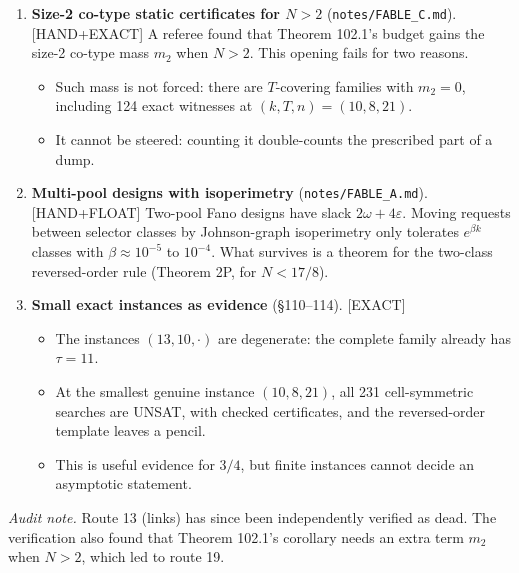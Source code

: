 \documentclass[11pt]{article}
\newcommand{\lvl}[1]{\textsf{\small[#1]}}
\begin{document}
\begin{enumerate}[leftmargin=*,label=\textbf{\arabic*.}]
 \begin{itemize}
 \item Take six members whose uncovered-pair endpoints fit in a $T$-set. One request then finishes, and this does
 imply CP.
 \item But it is CP with one inessential dump. Net of baseline dumping its budget is $5\varepsilon-\delta<0$ in the
 window.
 \end{itemize}
\item \textbf{Size-2 co-type static certificates for $N>2$} (\texttt{notes/FABLE\_C.md}). \lvl{HAND+EXACT} A referee
found that Theorem 102.1's budget gains the size-2 co-type mass $m_2$ when $N>2$. This opening fails for two reasons.
 \begin{itemize}
 \item Such mass is not forced: there are $T$-covering families with $m_2=0$, including 124 exact witnesses at
 $(k,T,n)=(10,8,21)$.
 \item It cannot be steered: counting it double-counts the prescribed part of a dump.
 \end{itemize}
\item \textbf{Multi-pool designs with isoperimetry} (\texttt{notes/FABLE\_A.md}). \lvl{HAND+FLOAT} Two-pool Fano designs
have slack $2\omega+4\varepsilon$. Moving requests between selector classes by Johnson-graph isoperimetry only tolerates
$e^{\beta k}$ classes with $\beta\approx10^{-5}$ to $10^{-4}$. What survives is a theorem for the two-class
reversed-order rule (Theorem 2P, for $N<17/8$).
\item \textbf{Small exact instances as evidence} (\S110--114). \lvl{EXACT}
 \begin{itemize}
 \item The instances $(13,10,\cdot)$ are degenerate: the complete family already has $\tau=11$.
 \item At the smallest genuine instance $(10,8,21)$, all 231 cell-symmetric searches are UNSAT, with checked
 certificates, and the reversed-order template leaves a pencil.
 \item This is useful evidence for $3/4$, but finite instances cannot decide an asymptotic statement.
 \end{itemize}
\end{enumerate}
\noindent\emph{Audit note.} Route 13 (links) has since been independently verified as dead. The verification also
found that Theorem 102.1's corollary needs an extra term $m_2$ when $N>2$, which led to route 19.
\end{document}
